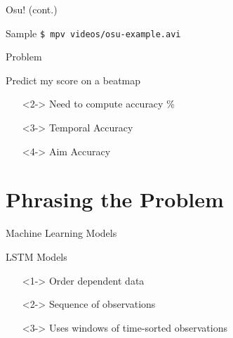 \documentclass[table]{beamer}
\begin{document}
\begin{frame}{Osu! (cont.)}
  \begin{block}{Sample}
    \texttt{\$ mpv videos/osu-example.avi}
  \end{block}
\end{frame}

\begin{frame}{Problem}
  \begin{block}{Predict my score on a beatmap}
    \begin{itemize}
    \item[]<2-> Need to compute accuracy \%
    \item[]<3-> Temporal Accuracy
    \item[]<4-> Aim Accuracy
    \end{itemize}
  \end{block}
\end{frame}

\section{Phrasing the Problem}

\begin{frame}{Machine Learning Models}
\end{frame}

\begin{frame}{LSTM Models}
  \begin{itemize}
  \item[]<1-> Order dependent data
  \item[]<2-> Sequence of observations
  \item[]<3-> Uses windows of time-sorted observations
  \end{itemize}
\end{frame}
\end{document}
